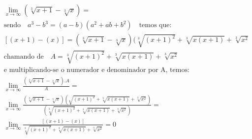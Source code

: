 \begin{ex}
\begin{align}
&\lim_{x\rightarrow \infty} (\sqrt[3]{x+1}-\sqrt[3]{x})=\nonumber\\
&\text{sendo}\quad a^3-b^3=(a-b)(a^2+ab+b^2)\quad\text{temos que:}\nonumber\\
&[(x+1)-(x)]=(\sqrt[3]{x+1}-\sqrt[3]{x})(\sqrt[3]{(x+1)^2}+\sqrt[3]{x(x+1)}+\sqrt[3]{x^2}\nonumber\\
&\text{chamando de}\quad A=\sqrt[3]{(x+1)^2}+\sqrt[3]{x(x+1)}+\sqrt[3]{x^2}\nonumber\\
&\text{e multiplicando-se o numerador e denominador por A, temos:}\nonumber\\
&\lim_{x\rightarrow \infty} \frac{(\sqrt[3]{x+1}-\sqrt[3]{x}).A}{A}=\nonumber\\
&\lim_{x\rightarrow \infty} \frac{(\sqrt[3]{x+1}-\sqrt[3]{x})(\sqrt{(x+1)^2}+\sqrt[3]{x(x+1)}+\sqrt[3]{x^2})}{(\sqrt[3]{(x+1)^2}+\sqrt[3]{x(x+1)}+\sqrt[3]{x^2})}=\nonumber\\
&\lim_{x\rightarrow \infty} \frac{[(x+1)-(x)]}{\sqrt[3]{(x+1)^2}+\sqrt[3]{x(x+1)}+\sqrt[3]{x^2}}=0\nonumber
\end{align}
\end{ex}